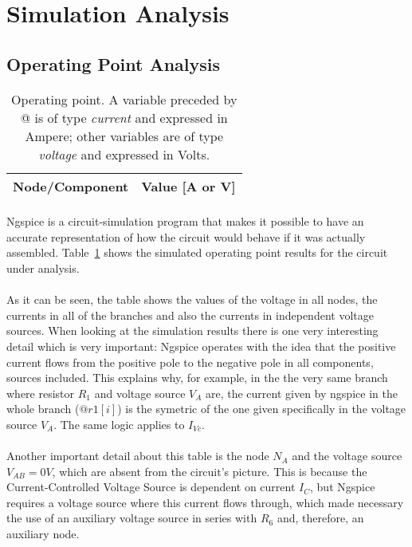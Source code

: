 \section{Simulation Analysis}
\label{sec:simulation}

\subsection{Operating Point Analysis}
\label{subsec:opa}

\begin{table}[h] \centering
  \begin{tabular}{|l|r|}
    \hline    
    {\bf Node/Component} & {\bf Value [A or V]} \\ \hline
    
  \end{tabular}
  \caption*{Operating point. A variable preceded by @ is of type {\em current}
    and expressed in Ampere; other variables are of type {\it voltage} and expressed in
    Volts.}
  \label{tab:op}
\end{table}



\paragraph{}Ngspice is a circuit-simulation program that makes it possible to have an accurate representation of how the circuit would behave if it was actually assembled. Table~\ref{tab:op} shows the simulated operating point results for the circuit
under analysis.


\paragraph{}As it can be seen, the table shows the values of the voltage in all nodes, the currents in all of the branches and also the currents in independent voltage sources. When looking at the simulation results there is one very interesting detail which is very important: Ngspice operates with the idea that the positive current flows from the positive pole to the negative pole in all components, sources included. This explains why, for example, in the the very same branch where resistor $R_1$ and voltage source $V_A$ are, the current given by ngspice in the whole branch ($@r1[i]$) is the symetric of the one given specifically in the voltage source $V_A$. The same logic applies to $I_{Vc}$. 
\paragraph{} Another important detail about this table is the node $N_A$ and the voltage source $V_{AB} = 0 V$, which are absent from the circuit's picture. This is because the Current-Controlled Voltage Source is dependent on current $I_C$, but Ngspice requires a voltage source where this current flows through, which made necessary the use of an auxiliary voltage source in series with $R_6$ and, therefore, an auxiliary node.  



